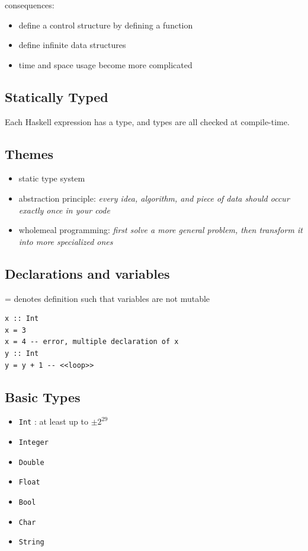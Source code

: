 \documentclass{article}
\begin{document}
consequences:
\begin{itemize}
    \item define a control structure by defining a function
    \item define infinite data structures
    \item time and space usage become more complicated
\end{itemize}

\subsection{Statically Typed}
\begin{definition}
    Each Haskell expression has a type, and types are all checked at compile-time.
\end{definition}

\subsection{Themes}
\begin{itemize}
    \item static type system
    \item abstraction principle:
          \textit{every idea, algorithm, and piece of data should occur exactly once in your code}
    \item wholemeal programming:
          \textit{first solve a more general problem, then transform it into more specialized ones}
\end{itemize}

\subsection{Declarations and variables}
\begin{definition}[=]
    = denotes definition such that variables are not mutable
\end{definition}

\begin{example}
    \begin{verbatim}
x :: Int
x = 3
x = 4 -- error, multiple declaration of x
y :: Int
y = y + 1 -- <<loop>>
\end{verbatim}
\end{example}

\subsection{Basic Types}
\begin{itemize}
    \item \verb|Int| : at least up to $\pm 2^{29}$
    \item \verb|Integer|
    \item \verb|Double|
    \item \verb|Float|
    \item \verb|Bool|
    \item \verb|Char|
    \item \verb|String|
\end{itemize}
\end{document}
